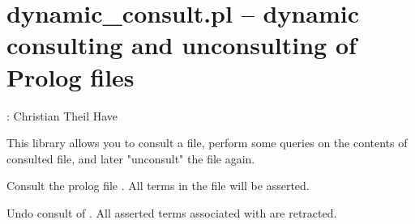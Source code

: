 


\section{dynamic_consult.pl -- dynamic consulting and unconsulting of Prolog files}

\label{sec:dynamicconsult}

\begin{tags}
: Christian Theil Have
\end{tags}

This library allows you to consult a file, perform some queries on the contents of consulted file, and later
"unconsult" the file again.\vspace{0.7cm}

\begin{description}
Consult the prolog file . All terms in the file will be asserted.

Undo consult of . All asserted terms associated with  are retracted.
\end{description}

